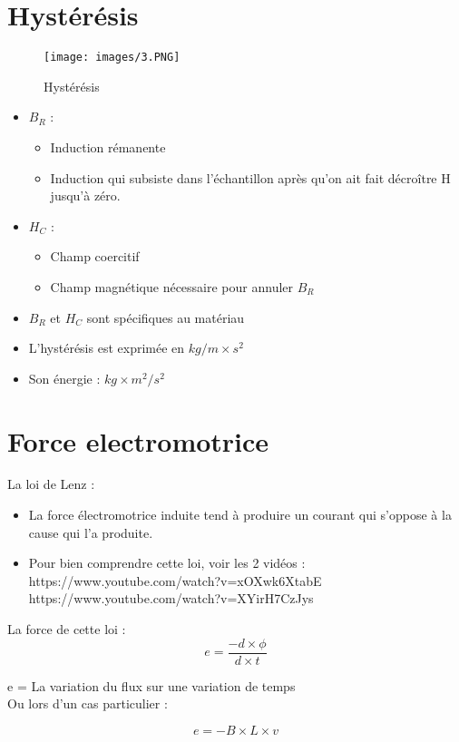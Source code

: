 \documentclass[a4paper]{article}
\begin{document}
\section{Hystérésis}
\begin{figure}[H]
    \centering
    \texttt{[image: images/3.PNG]}
    \caption{Hystérésis}
\end{figure}
\begin{itemize}
    \item $B_R$ :
    \begin{itemize}
        \item Induction rémanente
        \item Induction qui subsiste dans l'échantillon après qu'on ait fait décroître H jusqu'à zéro.
    \end{itemize}
    \item $H_C$ :
    \begin{itemize}
        \item Champ coercitif
        \item Champ magnétique nécessaire pour annuler $B_R$
    \end{itemize}
    \item $B_R$ et $H_C$ sont spécifiques au matériau
    \item L'hystérésis est exprimée en $kg /m\times s^2$
    \item Son énergie : $kg \times m^2 / s^2$
\end{itemize}

\section{Force electromotrice}
La loi de Lenz : 
\begin{itemize}
    \item La force électromotrice induite
    tend à produire un courant qui s’oppose à la
    cause qui l’a produite.
    \item Pour bien comprendre cette loi, voir les 2 vidéos :\\ 
    https://www.youtube.com/watch?v=xOXwk6XtabE \\ 
    https://www.youtube.com/watch?v=XYirH7CzJys
\end{itemize}
La force de cette loi :
$$e = \frac{-d\times\phi}{d\times t}$$
\begin{center}
    e = La variation du flux sur une variation de temps\\
    Ou lors d'un cas particulier :
\end{center}
$$e = - B \times L \times v$$
\end{document}
